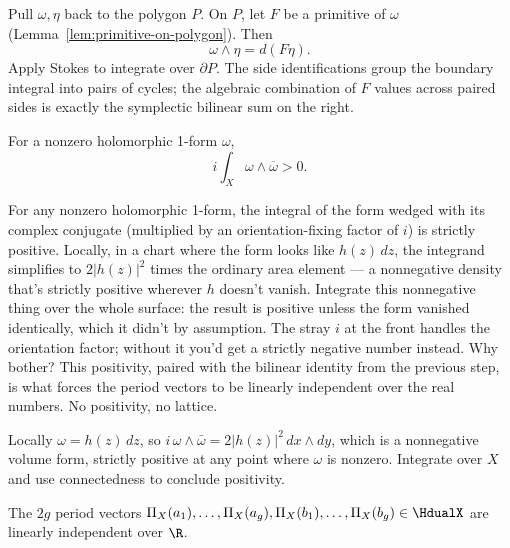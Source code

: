 \begin{proofsketch}
Pull \(\omega,\eta\) back to the polygon \(P\). On \(P\), let \(F\) be a
primitive of \(\omega\) (Lemma~\ref{lem:primitive-on-polygon}). Then
\[
  \omega\wedge\eta = d(F\eta).
\]
Apply Stokes to integrate over \(\partial P\). The side identifications
group the boundary integral into pairs of cycles; the algebraic
combination of \(F\) values across paired sides is exactly the symplectic
bilinear sum on the right.
\end{proofsketch}

\begin{theorem}
\label{thm:hermitian-positivity}
For a nonzero holomorphic 1-form \(\omega\),
\[
  i\int_X \omega\wedge\overline{\omega} > 0.
\]
\notready
\end{theorem}

\begin{layman}
For any nonzero holomorphic 1-form, the integral of the form wedged with
its complex conjugate (multiplied by an orientation-fixing factor of
\(i\)) is strictly positive. Locally, in a chart where the form looks
like \(h(z)\,dz\), the integrand simplifies to \(2|h(z)|^2\) times the
ordinary area element — a nonnegative density that's strictly positive
wherever \(h\) doesn't vanish. Integrate this nonnegative thing over
the whole surface: the result is positive unless the form vanished
identically, which it didn't by assumption. The stray \(i\) at the
front handles the orientation factor; without it you'd get a strictly
negative number instead. Why bother? This positivity, paired with the
bilinear identity from the previous step, is what forces the period
vectors to be linearly independent over the real numbers. No
positivity, no lattice.
\end{layman}

\begin{proofsketch}
Locally \(\omega = h(z)\,dz\), so
\(i\,\omega\wedge\bar\omega = 2|h(z)|^{2}\,dx\wedge dy\),
which is a nonnegative volume form, strictly positive at any point
where \(\omega\) is nonzero. Integrate over \(X\) and use connectedness
to conclude positivity.
\end{proofsketch}

\begin{theorem}
\label{thm:period-vectors-full-real-rank}
The \(2g\) period vectors
\(\Pi_X(a_1),\dots,\Pi_X(a_g),\Pi_X(b_1),\dots,\Pi_X(b_g)
   \in\HdualX\)
are linearly independent over \(\R\).
\leanok
\end{theorem}

